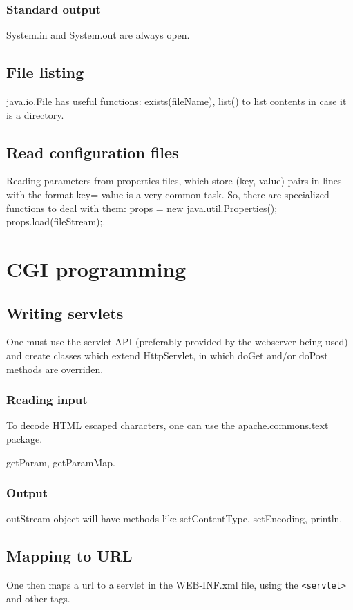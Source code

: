 \subsubsection{Standard output}
System.in and System.out are always open.

\subsection{File listing}
java.io.File has useful functions: exists(fileName), list() to list contents in case it is a directory.

\subsection{Read configuration files}
Reading parameters from properties files, which store (key, value) pairs in lines with the format key= value is a very common task. So, there are specialized functions to deal with them: props = new java.util.Properties();  props.load(fileStream);.


\section{CGI programming}
\subsection{Writing servlets}
One must use the servlet API (preferably provided by the webserver being used) and create classes which extend HttpServlet, in which doGet and/or doPost methods are overriden.

\subsubsection{Reading input}
To decode HTML escaped characters, one can use the apache.commons.text package.

getParam, getParamMap.


\subsubsection{Output}
outStream object will have methods like setContentType, setEncoding, println.

\subsection{Mapping to URL}
One then maps a url to a servlet in the WEB-INF.xml file, using the \verb'<servlet>' and other tags.

